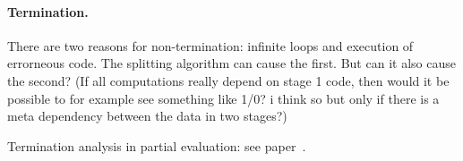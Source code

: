 \paragraph{Termination.}

There are two reasons for non-termination: infinite loops and
execution of errorneous code.  The splitting algorithm can cause the
first.  But can it also cause the second? (If all computations really
depend on stage 1 code, then would it be possible to for example see
something like 1/0?  i think so but only if there is a meta dependency
between the data in two stages?)

Termination analysis in partial evaluation: see paper~\cite{AH96,GJ05}.

